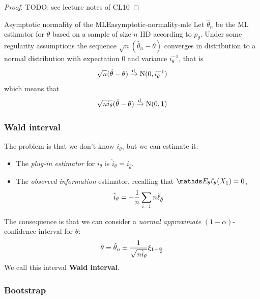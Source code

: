 \documentclass[12pt]{extarticle}
\newcommand{\Normal}{{\operatorfont N}}
\newcommand{\convdist}{\xrightarrow{\operatorfont d}}
\begin{document}
\begin{proof}
	TODO: see lecture notes of CL10
\end{proof}

\begin{theorem}{Asymptotic normality of the MLE}{asymptotic-normality-mle}
	Let $\hat \theta_n$ be the ML estimator for $\theta$ based on a sample of size $n$ IID according to $p_\theta$.
	Under some regularity assumptions the sequence $\sqrt n (\hat \theta_n - \theta)$ converges in distribution to a normal distribution with expectation $0$ and variance $i_\theta^{-1}$, that is
	\begin{equation}
		\sqrt n (\hat \theta - \theta) \convdist \Normal(0, i_\theta^{-1})
	\end{equation}
	which means that
	\begin{equation}
		\sqrt{n i_\theta}(\hat \theta - \theta) \convdist \Normal(0, 1)
	\end{equation}
\end{theorem}

\subsubsection{Wald interval}

The problem is that we don't know $i_\theta$, but we can estimate it:
\begin{itemize}
	\item The \emph{plug-in estimator} for $i_\theta$ is $\hat i_\theta = i_{\hat \theta}$.
	\item The \emph{observed information} estimator, recalling that $\E_\theta \ell_\theta (X_1) = 0$,
	      \begin{equation}
		      \hat i_\theta = -\frac{1}{n} \sum_{i = 1}{n} \ddot \ell_{\hat \theta}
	      \end{equation}
\end{itemize}

The consequence is that we can consider a \emph{normal approximate} $(1-\alpha)$-confidence interval for $\theta$:
\begin{equation}
	\theta = \hat \theta_n \pm \frac{1}{\sqrt{n \hat i_\theta}} \xi_{1- \frac{\alpha}{2}}
\end{equation}
We call this interval \textbf{Wald interval}.

\subsubsection{Bootstrap}
\end{document}
